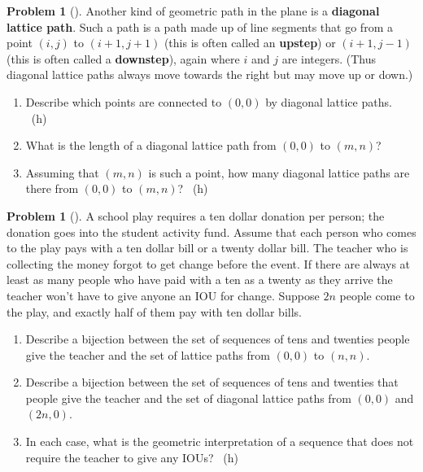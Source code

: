 \documentclass[10pt,]{book}
\newcommand{\terminology}[1]{\textbf{#1}}
\theoremstyle{plain}
\theoremstyle{definition}
\newtheorem{activity}[project]{Problem}
\theoremstyle{definition}
\numberwithin{equation}{chapter}
\begin{document}
\begin{activity}[] \label{diagonallattice}
\hypertarget{p-281}{}%
Another kind of geometric path in the plane is a \terminology{diagonal lattice path}. Such a path is a path made up of line segments that go from a point \((i,j)\) to \((i+1,j+1)\) (this is often called an \terminology{upstep}) or \((i+1,j-1)\) (this is often called a \terminology{downstep}), again where \(i\) and \(j\) are integers. (Thus diagonal lattice paths always move towards the right but may move up or down.)%
\begin{enumerate}[font=\bfseries,label=(\alph*),ref=\alph*]
\item\label{task-50} \marginsymbol[-2.5em]{} \hypertarget{p-282}{}%
Describe which points are connected to \((0,0)\) by diagonal lattice paths.%
~{\tiny (h)}\item\label{task-51} \marginsymbol[-2.5em]{} \hypertarget{p-285}{}%
What is the length of a diagonal lattice path from \((0,0)\) to \((m,n)\)?%
\item\label{task-52} \marginsymbol[-2.5em]{} \hypertarget{p-287}{}%
Assuming that \((m,n)\) is such a point, how many diagonal lattice paths are there from \((0,0)\) to \((m,n)\)?%
~{\tiny (h)}\end{enumerate}
\end{activity}
\begin{activity}[] \label{activity-50}
\hypertarget{p-290}{}%
A school play requires a ten dollar donation per person; the donation goes into the student activity fund. Assume that each person who comes to the play pays with a ten dollar bill or a twenty dollar bill. The teacher who is collecting the money forgot to get change before the event. If there are always at least as many people who have paid with a ten as a twenty as they arrive the teacher won't have to give anyone an IOU for change. Suppose \(2n\) people come to the play, and exactly half of them pay with ten dollar bills.%
\begin{enumerate}[font=\bfseries,label=(\alph*),ref=\alph*]
\item\label{task-53} \marginsymbol[-2.5em]{} \hypertarget{p-291}{}%
Describe a bijection between the set of sequences of tens and twenties people give the teacher and the set of lattice paths from \((0,0)\) to \((n,n)\).%
\item\label{task-54} \marginsymbol[-2.5em]{} \hypertarget{p-293}{}%
Describe a bijection between the set of sequences of tens and twenties that people give the teacher and the set of diagonal lattice paths from \((0,0)\) and \((2n,0)\).%
\item\label{task-55} \marginsymbol[-2.5em]{} \hypertarget{p-295}{}%
In each case, what is the geometric interpretation of a sequence that does not require the teacher to give any IOUs?%
~{\tiny (h)}\end{enumerate}
\end{activity}
\end{document}
